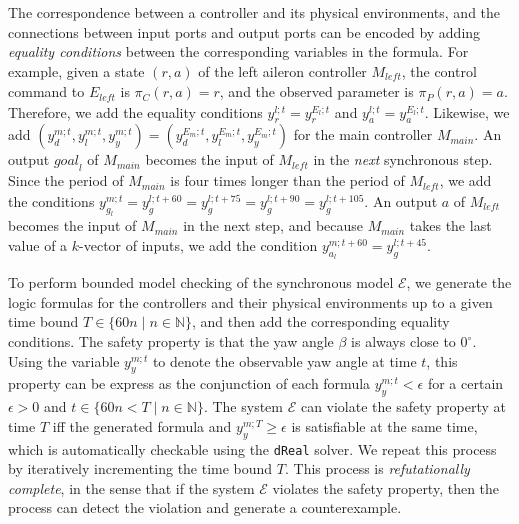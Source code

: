 \documentclass{sig-alternate}
\begin{document}
The correspondence between a controller and its physical environments,
and the connections between input ports and output ports 
can be encoded
by adding   
\emph{equality conditions} between the corresponding variables
in the formula.
For example, 
given a state $(r, a)$ of the left 
aileron controller $M_\mathit{left}$,
the control command to $E_\mathit{left}$ is $\pi_C(r,a) = r$,
and the observed parameter is $\pi_P(r,a) = a$.
Therefore, we add the 
equality conditions 
$y_{r}^{l;t} = y_{r}^{E_l;t}$ and $y_{a}^{l;t} = y_{a}^{E_l;t}$.
Likewise, we add $(y_d^{m;t}, y_l^{m;t}, y_y^{m;t}) = (y_d^{E_m;t},  y_l^{E_m;t}, y_y^{E_m;t})$
for the main controller $M_\mathit{main}$.
An output $\mathit{goal}_l$ of $M_\mathit{main}$
becomes the input of $M_\mathit{left}$ in the \emph{next} synchronous step.
Since the period of $M_\mathit{main}$ is four times longer than the period of $M_\mathit{left}$,
we add 
the conditions 
$y_{g_l}^{m;t} = y_{g}^{l;t + 60} =  y_{g}^{l;t + 75} 
=  y_{g}^{l;t + 90} = y_{g}^{l;t + 105}$.
An output $a$ of  $M_\mathit{left}$
becomes the input of $M_\mathit{main}$ in the next step,
and because $M_\mathit{main}$ takes the last value of a $k$-vector of inputs,
we add the condition  $y_{a_l}^{m;t + 60} = y_{g}^{l;t + 45}$.




To perform bounded model checking of the synchronous model $\mathcal{E}$,
we generate the logic formulas for the controllers and their physical environments
up to a given time bound $T \in \{60 n \mid n \in \mathbb{N}\}$,
and then add the corresponding equality conditions.
The safety property %
is that 
the yaw angle $\beta$ is always close to $0^\circ$.
Using the variable $y_y^{m;t}$ to denote the observable yaw angle at time $t$,
this property can be express as the conjunction of each formula $y_y^{m;t} < \epsilon$ for 
a certain $\epsilon > 0$ and $t \in \{60 n < T\mid n \in \mathbb{N}\}$.
The system $\mathcal{E}$ can violate the safety property 
at time $T$
iff the generated formula and $y_y^{m;T} \geq \epsilon$
is satisfiable at the same time,
which is automatically checkable using the \texttt{dReal} solver.
We repeat this process by iteratively incrementing the time bound $T$.
This process is \emph{refutationally complete},
in the sense that 
if the system $\mathcal{E}$ violates the safety property,
then  the process can detect the violation and generate a counterexample.
\end{document}

